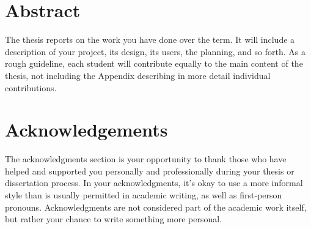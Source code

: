 \documentclass[12pt,twoside,a4paper,fleqn]{report}
\begin{document}
\chapter*{Abstract}

    The thesis reports on the work you have done over the term. It will include a description of your project, its design, its users, the planning, and so forth. As a rough guideline, each student will contribute equally to the main content of the thesis, not including the Appendix describing in more detail individual contributions.

 \cleardoublepage
\chapter*{Acknowledgements}
    The acknowledgments section is your opportunity to thank those who have helped and supported you personally and professionally during your thesis or dissertation process. In your acknowledgments, it's okay to use a more informal style than is usually permitted in academic writing, as well as first-person pronouns. Acknowledgments are not considered part of the academic work itself, but rather your chance to write something more personal. 
\cleardoublepage
\setcounter{tocdepth}{4}            %
\tableofcontents                    %
\cleardoublepage                    %
\pagestyle{fancy}               	%
\setlength{\parindent}{20pt}        %
\end{document}
